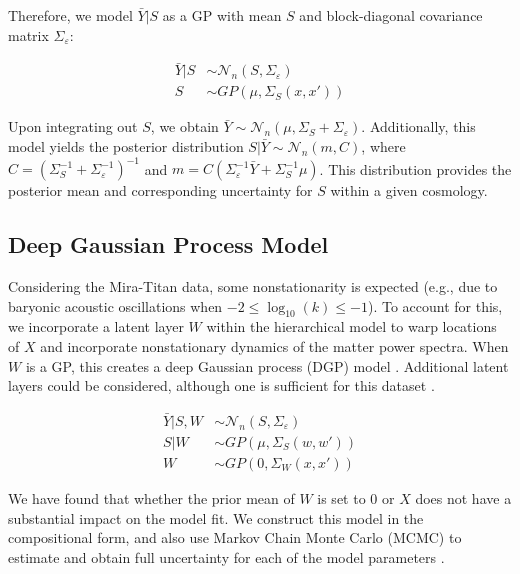 \documentclass[11pt]{article}
\begin{document}
Therefore, we model $\bar Y|S$ as a GP with mean $S$ and block-diagonal covariance 
matrix $\Sigma_\varepsilon$:

\begin{align}
\bar Y|S &\sim \mathcal{N}_n(S,\Sigma_\varepsilon) \\
S &\sim GP\left(\mu, \Sigma_S(x,x')\right)
\end{align}

Upon integrating out $S$, we obtain $\bar Y \sim \mathcal{N}_n(\mu, \Sigma_S+\Sigma_\varepsilon)$. 
Additionally, this model yields the posterior distribution $S|\bar Y \sim \mathcal{N}_n(m, C)$, 
where $C=\left(\Sigma_S^{-1}+\Sigma_\varepsilon^{-1}\right)^{-1}$ and 
$m=C\left(\Sigma_\varepsilon^{-1}\bar Y+\Sigma_S^{-1}\mu\right)$. 
This distribution provides the posterior mean and corresponding uncertainty for 
$S$ within a given cosmology. 

\subsection{Deep Gaussian Process Model}

Considering the Mira-Titan data, some nonstationarity is expected (e.g., due to 
baryonic acoustic oscillations when $-2 \leq \log_{10}(k) \leq -1$). To account 
for this, we incorporate a latent layer $W$ within the hierarchical model to warp 
locations of $X$ and incorporate nonstationary dynamics of the matter power spectra. 
When $W$ is a GP, this creates a deep Gaussian process (DGP) model \citep{damianou2013deep}. 
Additional latent layers could be considered, although one is sufficient for this 
dataset \citep{dunlop2018deep}.

\begin{align}
\bar Y|S,W &\sim \mathcal{N}_n(S,\Sigma_\varepsilon) \\
S|W &\sim GP\left(\mu, \Sigma_S(w,w')\right) \\
W &\sim GP\left(0, \Sigma_W(x,x')\right)
\end{align}

We have found that whether the prior mean of $W$ is set to 0 or $X$ 
\citep[which would indicate stationarity apriori,][]{schmidt2003bayesian} does not 
have a substantial impact on the model fit. We construct this model in the 
compositional form, and also use Markov Chain Monte Carlo (MCMC) to estimate and 
obtain full uncertainty for each of the model parameters \citep{sauer2023active}.
\end{document}
